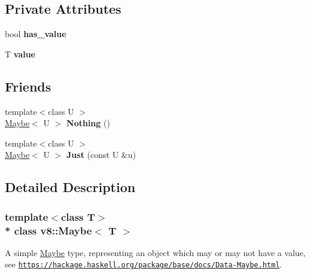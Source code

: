 \subsection*{Private Attributes}
\begin{DoxyCompactItemize}
\item 
bool {\bfseries has\+\_\+value}\hypertarget{classv8_1_1_maybe_afd7a3ebca6d97a4b87f2829a28723b0b}{}\label{classv8_1_1_maybe_afd7a3ebca6d97a4b87f2829a28723b0b}

\item 
T {\bfseries value}\hypertarget{classv8_1_1_maybe_ac3e067a7ae1b5cc92c2f570499db31ea}{}\label{classv8_1_1_maybe_ac3e067a7ae1b5cc92c2f570499db31ea}

\end{DoxyCompactItemize}
\subsection*{Friends}
\begin{DoxyCompactItemize}
\item 
{\footnotesize template$<$class U $>$ }\\\hyperlink{classv8_1_1_maybe}{Maybe}$<$ U $>$ {\bfseries Nothing} ()\hypertarget{classv8_1_1_maybe_aeb9593e125b42d748acbd69b72c89f37}{}\label{classv8_1_1_maybe_aeb9593e125b42d748acbd69b72c89f37}

\item 
{\footnotesize template$<$class U $>$ }\\\hyperlink{classv8_1_1_maybe}{Maybe}$<$ U $>$ {\bfseries Just} (const U \&u)\hypertarget{classv8_1_1_maybe_aeff0e7fedd63cfebe9a5286e2cd8552d}{}\label{classv8_1_1_maybe_aeff0e7fedd63cfebe9a5286e2cd8552d}

\end{DoxyCompactItemize}


\subsection{Detailed Description}
\subsubsection*{template$<$class T$>$\\*
class v8\+::\+Maybe$<$ T $>$}

A simple \hyperlink{classv8_1_1_maybe}{Maybe} type, representing an object which may or may not have a value, see \href{https://hackage.haskell.org/package/base/docs/Data-Maybe.html}{\tt https\+://hackage.\+haskell.\+org/package/base/docs/\+Data-\/\+Maybe.\+html}.

